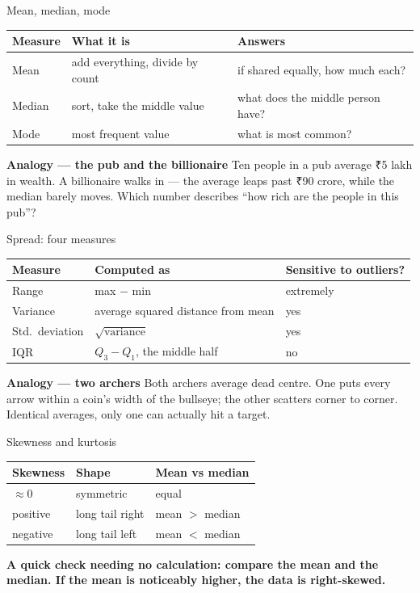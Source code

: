 \documentclass[10pt,aspectratio=169]{beamer}
\newcommand{\keyidea}[1]{%
  \begin{block}{}
  \centering\Large\bfseries\color{dsblue} #1
  \end{block}%
}
\newcommand{\analogybox}[2]{%
  \begin{exampleblock}{\textbf{Analogy --- #1}}
  #2
  \end{exampleblock}%
}
\begin{document}
\begin{frame}{Mean, median, mode}
\begin{table}
\small
\begin{tabularx}{\linewidth}{@{}lXX@{}}
\toprule
\textbf{Measure} & \textbf{What it is} & \textbf{Answers} \\
\midrule
Mean & add everything, divide by count & if shared equally, how much each? \\
Median & sort, take the middle value & what does the middle person have? \\
Mode & most frequent value & what is most common? \\
\bottomrule
\end{tabularx}
\end{table}
\analogybox{the pub and the billionaire}{Ten people in a pub average ₹5 lakh in wealth. A billionaire walks in --- the average leaps past ₹90 crore, while the median barely moves. Which number describes ``how rich are the people in this pub''?}
\end{frame}

\begin{frame}{Spread: four measures}
\begin{table}
\small
\begin{tabularx}{\linewidth}{@{}lXl@{}}
\toprule
\textbf{Measure} & \textbf{Computed as} & \textbf{Sensitive to outliers?} \\
\midrule
Range & max $-$ min & extremely \\
Variance & average squared distance from mean & yes \\
Std.\ deviation & $\sqrt{\text{variance}}$ & yes \\
IQR & $Q_3-Q_1$, the middle half & no \\
\bottomrule
\end{tabularx}
\end{table}
\analogybox{two archers}{Both archers average dead centre. One puts every arrow within a coin's width of the bullseye; the other scatters corner to corner. Identical averages, only one can actually hit a target.}
\end{frame}

\begin{frame}{Skewness and kurtosis}
\begin{table}
\small
\begin{tabularx}{\linewidth}{@{}lXX@{}}
\toprule
\textbf{Skewness} & \textbf{Shape} & \textbf{Mean vs median} \\
\midrule
$\approx 0$ & symmetric & equal \\
positive & long tail right & mean $>$ median \\
negative & long tail left & mean $<$ median \\
\bottomrule
\end{tabularx}
\end{table}
\vspace{0.2cm}
\keyidea{A quick check needing no calculation: compare the mean and the median. If the mean is noticeably higher, the data is right-skewed.}
\end{frame}
\end{document}
